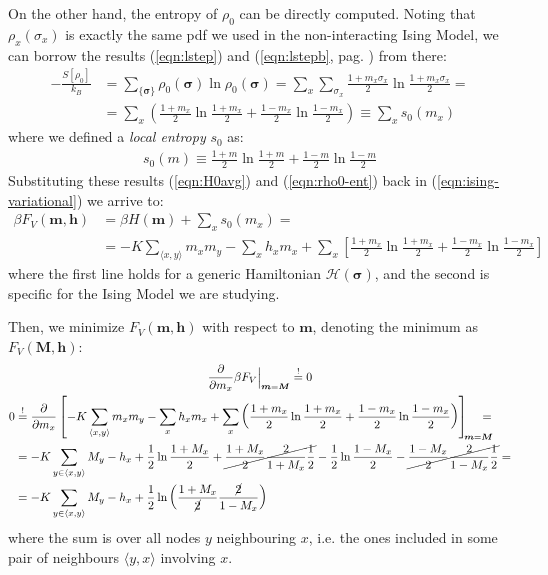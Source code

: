 \documentclass[../../main.tex]{subfiles}
\begin{document}
On the other hand, the entropy of $\rho_0$ can be directly computed. Noting that $\rho_x(\sigma_x)$ is exactly the same pdf we used in the non-interacting Ising Model, we can borrow the results (\ref{eqn:lstep}) and (\ref{eqn:lstepb}, pag. \pageref{eqn:lstep}) from there:
\begin{align}\nonumber
    -\frac{S[\rho_0]}{k_B} &= \sum_{\{\bm{\sigma}\}} \rho_0(\bm{\sigma}) \ln \rho_0(\bm{\sigma}) = \sum_x \sum_{\sigma_x} \frac{1+m_x \sigma_x}{2} \ln \frac{1+m_x \sigma_x}{2} =\\ \label{eqn:rho0-ent}
    &= \sum_x \left(\frac{1+m_x}{2} \ln \frac{1+m_x}{2} + \frac{1-m_x}{2} \ln \frac{1-m_x}{2} \right)  \equiv \sum_x s_0(m_x)
\end{align}
where we defined a \textit{local entropy} $s_0$ as: 
\begin{align}\label{eqn:local_entropy}
    s_0(m) \equiv \frac{1+m}{2} \ln \frac{1+m}{2} + \frac{1-m}{2} \ln \frac{1-m}{2}    
\end{align}
Substituting these results (\ref{eqn:H0avg}) and (\ref{eqn:rho0-ent}) back in (\ref{eqn:ising-variational}) we arrive to:
\begin{align} \label{eqn:var-free-energy}
    \beta F_V(\bm{m}, \bm{h}) &= \beta H(\bm{m}) + \sum_x s_0(m_x) =\\
    &= -K \sum_{\langle x,y \rangle} m_x m_y - \sum_x h_x m_x + \sum_x \left[\frac{1+m_x}{2} \ln \frac{1+m_x}{2} + \frac{1-m_x}{2} \ln \frac{1-m_x}{2}    \right] \nonumber
\end{align}
where the first line holds for a generic Hamiltonian $\mathcal{H}(\bm{\sigma})$, and the second is specific for the Ising Model we are studying.

\medskip

Then, we minimize $F_V(\bm{m}, \bm{h})$ with respect to $\bm{m}$, denoting the minimum as $F_V(\bm{M}, \bm{h})$:
\begin{align}
    \label{eqn:minimize}
    \pdv{m_x} \beta F_V \Big|_{\bm{m} = \bm{M}} \overset{!}{=}  0 \span \\ \nonumber
    0 &\overset{!}{=} \pdv{m_x} \left[-K \sum_{\langle x,y \rangle} m_x m_y - \sum_x h_x m_x + \sum_x \left(\frac{1+m_x}{2} \ln \frac{1+m_x}{2} + \frac{1-m_x}{2} \ln \frac{1-m_x}{2}    \right) \right]_{\quad\mathclap{\bm{m} = \bm{M}}} =\\ \nonumber
    &=-K\sum_{y \in \langle x,y \rangle} M_y - h_x + \frac{1}{2}\ln \frac{1+M_x}{2} + \cancel{\frac{1+M_x}{2} \frac{2}{1+M_x}\frac{1}{2}} - \frac{1}{2} \ln \frac{1-M_x}{2} - \cancel{\frac{1-M_x}{2} \frac{2}{1-M_x}\frac{1}{2}} =\\ \nonumber
    &= -K\sum_{y \in \langle x,y \rangle} M_y -h_x + \frac{1}{2} \ln\left(\frac{1+M_x}{\cancel{2}} \frac{\cancel{2}}{1-M_x}  \right) 
\end{align} 
where the sum is over all nodes $y$ neighbouring $x$, i.e. the ones included in some pair of neighbours $\langle y,x \rangle$ involving $x$.
\end{document}
